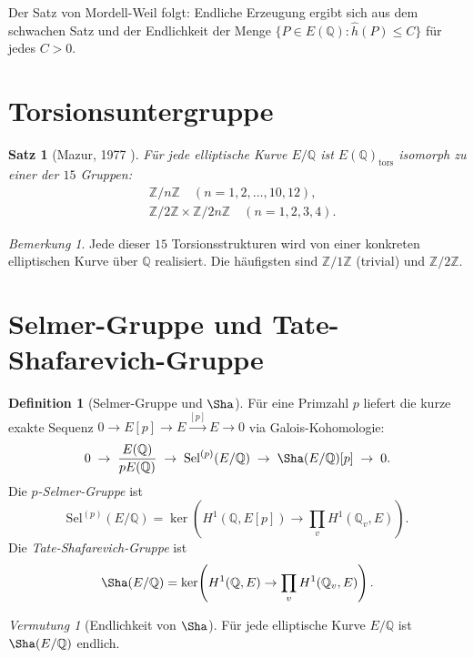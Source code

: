 \documentclass[12pt,a4paper]{amsart}
\newtheorem{satz}[theorem]{Satz}
\theoremstyle{definition}
\newtheorem{definition_de}[theorem]{Definition}
\theoremstyle{remark}
\newtheorem{bemerkung}[theorem]{Bemerkung}
\newtheorem{vermutung}[theorem]{Vermutung}
\newcommand{\Z}{\mathbb{Z}}
\newcommand{\Q}{\mathbb{Q}}
\newcommand{\Sel}{\mathrm{Sel}}
\begin{document}
Der Satz von Mordell-Weil folgt: Endliche Erzeugung ergibt sich aus dem schwachen Satz
und der Endlichkeit der Menge $\{P \in E(\Q) : \hat{h}(P) \leq C\}$ für jedes $C > 0$.

\section{Torsionsuntergruppe}\label{sec:torsion}

\begin{satz}[Mazur, 1977 \cite{Mazur1977}]
  Für jede elliptische Kurve $E/\Q$ ist $E(\Q)_{\mathrm{tors}}$ isomorph zu einer der
  $15$ Gruppen:
  \begin{align*}
    &\Z/n\Z \quad (n = 1,2,\ldots,10,12), \\
    &\Z/2\Z \times \Z/2n\Z \quad (n = 1,2,3,4).
  \end{align*}
\end{satz}

\begin{bemerkung}
  Jede dieser $15$ Torsionsstrukturen wird von einer konkreten elliptischen Kurve über
  $\Q$ realisiert. Die häufigsten sind $\Z/1\Z$ (trivial) und $\Z/2\Z$.
\end{bemerkung}

\section{Selmer-Gruppe und Tate-Shafarevich-Gruppe}\label{sec:selmer}

\begin{definition_de}[Selmer-Gruppe und $\Sha$]
  Für eine Primzahl $p$ liefert die kurze exakte Sequenz
  $0 \to E[p] \to E \xrightarrow{[p]} E \to 0$
  via Galois-Kohomologie:
  \[
    0 \;\to\; \frac{E(\Q)}{pE(\Q)} \;\to\; \Sel^{(p)}(E/\Q)
    \;\to\; \Sha(E/\Q)[p] \;\to\; 0.
  \]
  Die \emph{$p$-Selmer-Gruppe} ist
  \[
    \Sel^{(p)}(E/\Q) = \ker\!\left(H^1(\Q, E[p]) \to \prod_v H^1(\Q_v, E)\right).
  \]
  Die \emph{Tate-Shafarevich-Gruppe} ist
  \[
    \Sha(E/\Q) = \ker\!\left(H^1(\Q, E) \to \prod_v H^1(\Q_v, E)\right).
  \]
\end{definition_de}

\begin{vermutung}[Endlichkeit von $\Sha$]\label{verm:sha}
  Für jede elliptische Kurve $E/\Q$ ist $\Sha(E/\Q)$ endlich.
\end{vermutung}
\end{document}
